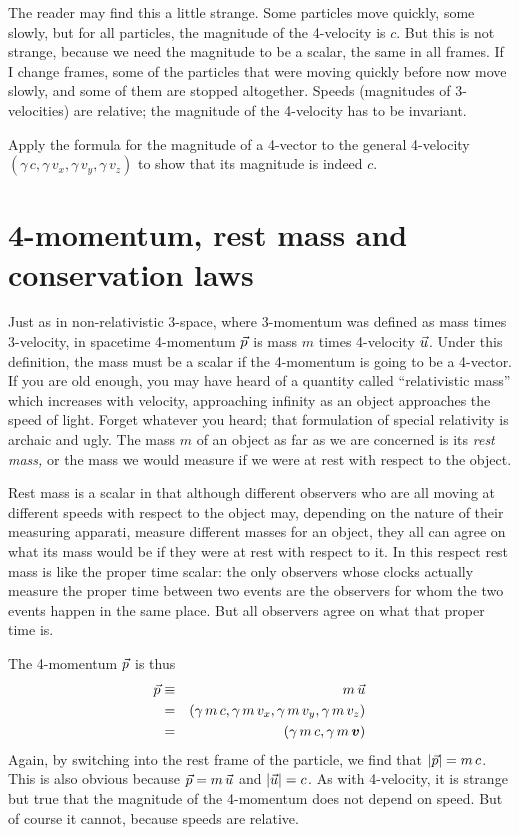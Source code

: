 The reader may find this a little strange.  Some particles move
quickly, some slowly, but for all particles, the magnitude of the
4-velocity is $c$.  But this is not strange, because we need the
magnitude to be a scalar, the same in all frames.  If I change frames,
some of the particles that were moving quickly before now move slowly,
and some of them are stopped altogether.  Speeds (magnitudes of
3-velocities) are relative; the magnitude of the 4-velocity has to be
invariant.

\begin{problem}
Apply the formula for the magnitude of a 4-vector to the general
4-velocity $(\gamma\,c,\gamma\,v_x,\gamma\,v_y,\gamma\,v_z)$ to show
that its magnitude is indeed $c$.
\end{problem}


\section{4-momentum, rest mass and conservation laws}
\label{sec:4-mom}

Just as in non-relativistic 3-space, where 3-momentum was defined as
mass times 3-velocity, in spacetime 4-momentum $\vec{p}$ is mass $m$
times 4-velocity $\vec{u}$.  Under this definition, the mass must be a
scalar if the 4-momentum is going to be a 4-vector.  If you are old
enough, you may have heard of a quantity called ``relativistic mass''
which increases with velocity, approaching infinity as an object
approaches the speed of light.  Forget whatever you heard; that
formulation of special relativity is archaic and ugly.  The mass $m$
of an object as far as we are concerned is its {\em rest mass,\/} or
the mass we would measure if we were at rest with respect to the
object.

Rest mass is a scalar in that although different observers who are all
moving at different speeds with respect to the object may, depending
on the nature of their measuring apparati, measure different masses for
an object, they all can agree on what its mass would be if they were
at rest with respect to it.  In this respect rest mass is like the
proper time scalar: the only observers whose clocks actually measure
the proper time between two events are the observers for whom the two
events happen in the same place.  But all observers agree on what that
proper time is.

The 4-momentum $\vec{p}$ is thus
\begin{eqnarray}
\vec{p} & \equiv & m\,\vec{u} \nonumber\\
& = & (\gamma\,m\,c,\gamma\,m\,v_x,\gamma\,m\,v_y,\gamma\,m\,v_z) \nonumber\\
& = & (\gamma\,m\,c,\gamma\,m\,\mbox{\boldmath $v$})
\end{eqnarray}
Again, by switching into the rest frame of the particle, we find that
$|\vec{p}|=m\,c$.  This is also obvious because $\vec{p}=m\,\vec{u}$ and
$|\vec{u}|=c$.  As with 4-velocity, it is strange but true that the
magnitude of the 4-momentum does not depend on speed.  But of course
it cannot, because speeds are relative.

